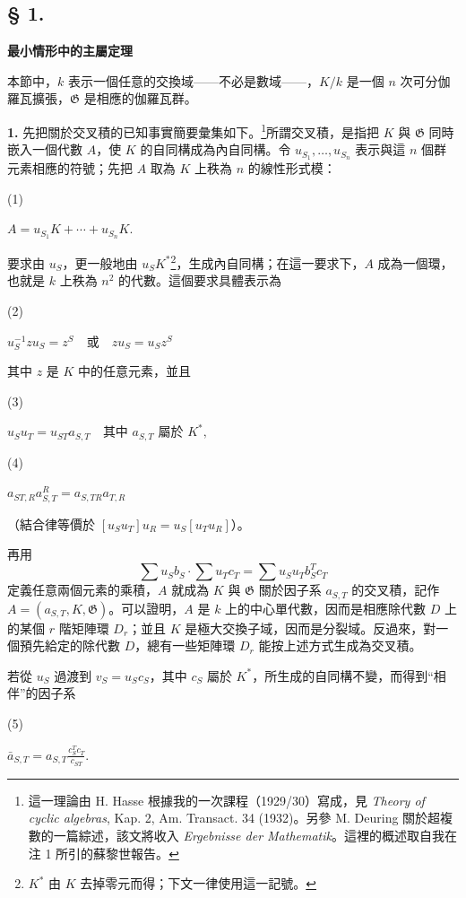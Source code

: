 \documentclass[11pt]{article}
\providecommand{\srcnumdisplay}[3][3.4em]{%
  \par\smallskip\noindent
  \begin{minipage}[t]{#1}\vspace*{0pt}#2\end{minipage}%
  \begin{minipage}[t]{\dimexpr\linewidth-#1\relax}\vspace*{0pt}\centering
  \(\displaystyle #3\)
  \end{minipage}\par\smallskip}
\begin{document}
\subsection*{§ 1.}
\begin{center}
\textbf{最小情形中的主屬定理}
\end{center}

本節中，\(k\) 表示一個任意的交換域——不必是數域——，\(K/k\) 是一個 \(n\) 次可分伽羅瓦擴張，\(\mathfrak G\) 是相應的伽羅瓦群。

\noindent\textbf{1.} 先把關於交叉積的已知事實簡要彙集如下。\footnote{這一理論由 H. Hasse 根據我的一次課程（1929/30）寫成，見 \emph{Theory of cyclic algebras}, Kap. 2, Am. Transact. 34 (1932)。另參 M. Deuring 關於超複數的一篇綜述，該文將收入 \emph{Ergebnisse der Mathematik}。這裡的概述取自我在注 1 所引的蘇黎世報告。}所謂交叉積，是指把 \(K\) 與 \(\mathfrak G\) 同時嵌入一個代數 \(A\)，使 \(K\) 的自同構成為內自同構。令 \(u_{S_1},\ldots,u_{S_n}\) 表示與這 \(n\) 個群元素相應的符號；先把 \(A\) 取為 \(K\) 上秩為 \(n\) 的線性形式模：

\srcnumdisplay{(1)}{A=u_{S_1}K+\cdots+u_{S_n}K.}

要求由 \(u_S\)，更一般地由 \(u_SK^*\)\footnote{\(K^*\) 由 \(K\) 去掉零元而得；下文一律使用這一記號。}，生成內自同構；在這一要求下，\(A\) 成為一個環，也就是 \(k\) 上秩為 \(n^2\) 的代數。這個要求具體表示為

\srcnumdisplay{(2)}{u_S^{-1}zu_S=z^S\quad\text{或}\quad zu_S=u_Sz^S}

其中 \(z\) 是 \(K\) 中的任意元素，並且

\srcnumdisplay{(3)}{u_Su_T=u_{ST}a_{S,T}\quad\text{其中 }a_{S,T}\text{ 屬於 }K^*,}

\srcnumdisplay{(4)}{a_{ST,R}a_{S,T}^{R}=a_{S,TR}a_{T,R}}

（結合律等價於 \([u_Su_T]u_R=u_S[u_Tu_R]\)）。

再用
\[
\sum u_Sb_S\cdot\sum u_Tc_T=\sum u_Su_Tb_S^Tc_T
\]
定義任意兩個元素的乘積，\(A\) 就成為 \(K\) 與 \(\mathfrak G\) 關於因子系 \(a_{S,T}\) 的交叉積，記作 \(A=(a_{S,T},K,\mathfrak G)\)。可以證明，\(A\) 是 \(k\) 上的中心單代數，因而是相應除代數 \(D\) 上的某個 \(r\) 階矩陣環 \(D_r\)；並且 \(K\) 是極大交換子域，因而是分裂域。反過來，對一個預先給定的除代數 \(D\)，總有一些矩陣環 \(D_r\) 能按上述方式生成為交叉積。

若從 \(u_S\) 過渡到 \(v_S=u_Sc_S\)，其中 \(c_S\) 屬於 \(K^*\)，所生成的自同構不變，而得到“相伴”的因子系

\srcnumdisplay{(5)}{\bar a_{S,T}=a_{S,T}\frac{c_S^Tc_T}{c_{ST}}.}
\end{document}
